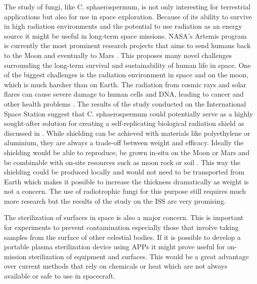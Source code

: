 The study of fungi, like C. sphaerospermum, is not only interesting for terrestrial applications but also for use in space exploration. Because of its ability to survive in high radiation environments and the potential to use radiation as an energy source it might be useful in long-term space missions. NASA's Artemis program is currently the most prominent research projects that aims to send humans back to the Moon and eventually to Mars \cite{artemis}. This proposes many novel challenges surrounding the long-term survival and sustainability of human life in space. One of the biggest challenges is the radiation environment in space and on the moon, which is much harsher than on Earth. The radiation from cosmic rays and solar flares can cause severe damage to human cells and DNA, leading to cancer and other health problems \cite{shield}. The results of the study conducted on the International Space Station \cite{iss} suggest that C. sphaerospermum could potentially serve as a highly sought-after solution for creating a self-replicating biological radiation shield as discussed in \cite{shield}. While shielding can be achieved with materials like polyethylene or aluminium, they are always a trade-off between weight and efficacy. Ideally the shielding would be able to reproduce, be grown in-situ on the Moon or Mars and be combinable with on-site resources such as moon rock or soil \cite{shield}. This way the shielding could be produced locally and would not need to be transported from Earth which makes it possible to increase the thickness dramatically as weight is not a concern. The use of radiotrophic fungi for this purpose still requires much more research but the results of the study on the ISS are very promising.

The sterilization of surfaces in space is also a major concern. This is important for experiments to prevent contamination especially those that involve taking samples from the surface of other celestial bodies. If it is possible to develop a portable plasma sterilization device using APPs it might prove useful for on-mission sterilization of equipment and surfaces. This would be a great advantage over current methods that rely on chemicals or heat which are not always available or safe to use in spacecraft.

